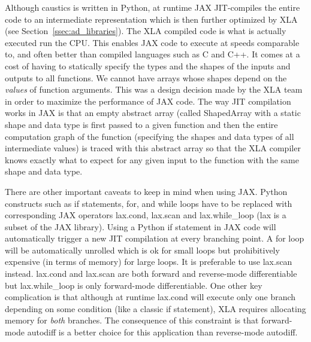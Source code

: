 \documentclass[12pt,dvipsnames]{report}
\newcommand{\ssf}[1]{\textsf{#1}}
\begin{document}
Although \ssf{caustics} is written in \ssf{Python}, at runtime JAX JIT-compiles 
the entire code to an intermediate representation which is then
further optimized by \ssf{XLA} (see Section~\ref{ssec:ad_libraries}). The XLA 
compiled code is what is actually executed run the CPU. 
This enables \ssf{JAX} code to execute at speeds comparable to, and often better 
than compiled
languages such as \ssf{C} and \ssf{C++}. It comes at a cost of having to
statically specify the types and the shapes of the inputs and outputs to all
functions. We cannot have arrays whose shapes depend on the \emph{values}
of function arguments. This was a design decision made by the \ssf{XLA} team in
order to maximize the performance of \ssf{JAX} code. The way JIT compilation
works in \ssf{JAX} is that an empty abstract array (called \ssf{ShapedArray} with a static shape and 
data type is first passed to a given function and then
the entire computation graph of the function (specifying the shapes and data
types of all intermediate values) is traced with this abstract array so that the XLA
compiler knows exactly what to expect for any given input to the function with
the same shape and data type.

There are other important caveats to keep in mind when using \ssf{JAX}.
\ssf{Python}
constructs such as \ssf{if} statements, \ssf{for}, and \ssf{while} loops have
to be replaced with corresponding \ssf{JAX} operators \ssf{lax.cond},
\ssf{lax.scan} and \ssf{lax.while\_loop} (\ssf{lax} is a subset of the
\ssf{JAX} library). Using a \ssf{Python} \ssf{if} statement in \ssf{JAX} code will automatically
trigger a new JIT compilation at every branching point. A \ssf{for} loop will
be automatically unrolled which is ok for small loops but prohibitively
expensive (in terms of memory) for large loops. It is preferable to use
\ssf{lax.scan} instead. \ssf{lax.cond} and \ssf{lax.scan} are both forward and
reverse-mode differentiable but \ssf{lax.while\_loop} is only forward-mode
differentiable. One other key complication is that although at runtime
\ssf{lax.cond} will execute only one branch depending on some condition (like a
classic \ssf{if} statement), XLA requires allocating memory for \emph{both}
branches. The consequence of this constraint is that forward-mode autodiff is a better
choice for this application than reverse-mode autodiff.
\end{document}
